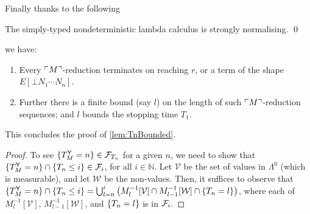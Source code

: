 Finally thanks to the following
\begin{theorem}
\label{thm:de groote}
The simply-typed nondeterministic lambda calculus is strongly normalising. \qed
\end{theorem}
we have:

\begin{enumerate}
\item Every ${\ulcorner{M}\urcorner}$-reduction terminates on reaching $r$, or a term of the shape $E[\bot N_1 \cdots N_n]$.

\item Further there is a finite bound (say $l$) on the length of such ${\ulcorner{M}\urcorner}$-reduction sequences; and $l$ bounds the stopping time $T_1$.
\end{enumerate}
This concludes the proof of \cref{lem:TnBounded}.

\iffalse
@inproceedings{DBLP:conf/lfcs/Groote94,
  author    = {Philippe de Groote},
  editor    = {Anil Nerode and
               Yuri V. Matiyasevich},
  title     = {Strong Normalization in a Non-Deterministic Typed Lambda-Calculus},
  booktitle = {Logical Foundations of Computer Science, Third International Symposium,
               LFCS'94, St. Petersburg, Russia, July 11-14, 1994, Proceedings},
  series    = {Lecture Notes in Computer Science},
  volume    = {813},
  pages     = {142--152},
  publisher = {Springer},
  year      = {1994},
  url       = {https://doi.org/10.1007/3-540-58140-5\_15},
  doi       = {10.1007/3-540-58140-5\_15},
  timestamp = {Tue, 14 May 2019 10:00:54 +0200},
  biburl    = {https://dblp.org/rec/conf/lfcs/Groote94.bib},
  bibsource = {dblp computer science bibliography, https://dblp.org}
}
\fi

\medskip

\TMtYStoppingTime*
\begin{proof}
To see $\{{T_M^{\mathsf{Y}} = n}\} \in \mathcal{F}_{T_n}$ for a given $n$, we need to show that $\{{T_M^{\mathsf{Y}} = n}\} \cap \{{T_n \leq i}\} \in \mathcal{F}_i$, for all $i \in \mathbb N$.
Let $\mathcal V$ be the set of values in $\Lambda^0$ (which is measurable), and let $\mathcal W$ be the non-values.
Then, it suffices to observe that $\{{T_M^{\mathsf{Y}} = n}\} \cap \{{T_n \leq i}\}
= \bigcup_{l=n}^i 
\big( M_l^{-1} [{\mathcal V}] \cap  
M_{l-1}^{-1} [{\mathcal W}] \cap 
\{{T_n = l}\} \big)
$, where each of $M_l^{-1} [{\mathcal V}]$, $M_{l-1}^{-1} [{\mathcal W}]$, and $\{{T_n = l}\}$ is in $\mathcal{F}_i$.
\end{proof}




